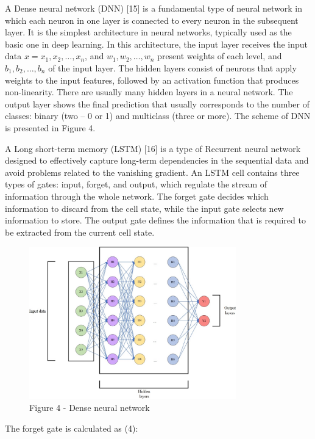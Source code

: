 A Dense neural network (DNN) {[}15{]} is a fundamental type of neural
network in which each neuron in one layer is connected to every neuron
in the subsequent layer. It is the simplest architecture in neural
networks, typically used as the basic one in deep learning. In this
architecture, the input layer receives the input data $x=x_1,x_2,\ldots,x_n$, and $w_1,w_2,\ldots,w_n$ present weights of each level, and $b_1,b_2,\ldots,b_n$
of the input layer. The hidden layers consist of neurons that apply
weights to the input features, followed by an activation function that
produces non-linearity. There are usually many hidden layers in a neural
network. The output layer shows the final prediction that usually
corresponds to the number of classes: binary (two -- 0 or 1) and
multiclass (three or more). The scheme of DNN is presented in Figure 4.

A Long short-term memory (LSTM) {[}16{]} is a type of Recurrent neural
network designed to effectively capture long-term dependencies in the
sequential data and avoid problems related to the vanishing gradient. An
LSTM cell contains three types of gates: input, forget, and output,
which regulate the stream of information through the whole network. The
forget gate decides which information to discard from the cell state,
while the input gate selects new information to store. The output gate
defines the information that is required to be extracted from the
current cell state.

\begin{figure}[H]
	\centering
	\includegraphics[width=0.8\textwidth]{media/ict/image44}
	\caption*{Figure 4 - Dense neural network}
\end{figure}

The forget gate is calculated as (4):

